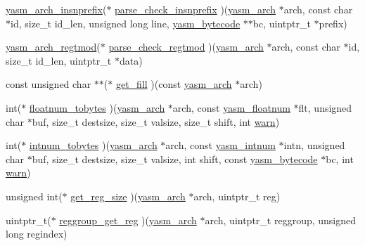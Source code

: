 \begin{DoxyCompactItemize}
\item 
\hyperlink{arch_8h_ac21db64e3ba86dfe84f8028f8c14cb2a}{yasm\-\_\-arch\-\_\-insnprefix}($\ast$ \hyperlink{structyasm__arch__module_a3dde1b6ec44c7d351f795ddafd364c48}{parse\-\_\-check\-\_\-insnprefix} )(\hyperlink{coretype_8h_a8e0de61d73c940f0e7b6ef12e0dc1c70}{yasm\-\_\-arch} $\ast$arch, const char $\ast$id, size\-\_\-t id\-\_\-len, unsigned long line, \hyperlink{structyasm__bytecode}{yasm\-\_\-bytecode} $\ast$$\ast$bc, uintptr\-\_\-t $\ast$prefix)
\item 
\hyperlink{arch_8h_a1261e0e39e12f0e4490924676c591376}{yasm\-\_\-arch\-\_\-regtmod}($\ast$ \hyperlink{structyasm__arch__module_a3ebd6e4bda71c110b9455b3965c148dd}{parse\-\_\-check\-\_\-regtmod} )(\hyperlink{coretype_8h_a8e0de61d73c940f0e7b6ef12e0dc1c70}{yasm\-\_\-arch} $\ast$arch, const char $\ast$id, size\-\_\-t id\-\_\-len, uintptr\-\_\-t $\ast$data)
\item 
const unsigned char $\ast$$\ast$($\ast$ \hyperlink{structyasm__arch__module_abb1c7db4c07489d563408f13526e7ef0}{get\-\_\-fill} )(const \hyperlink{coretype_8h_a8e0de61d73c940f0e7b6ef12e0dc1c70}{yasm\-\_\-arch} $\ast$arch)
\item 
int($\ast$ \hyperlink{structyasm__arch__module_adccc4dbe8cfed3b9a647622b70489468}{floatnum\-\_\-tobytes} )(\hyperlink{coretype_8h_a8e0de61d73c940f0e7b6ef12e0dc1c70}{yasm\-\_\-arch} $\ast$arch, const \hyperlink{structyasm__floatnum}{yasm\-\_\-floatnum} $\ast$flt, unsigned char $\ast$buf, size\-\_\-t destsize, size\-\_\-t valsize, size\-\_\-t shift, int \hyperlink{structwarn}{warn})
\item 
int($\ast$ \hyperlink{structyasm__arch__module_a07202501842115d0216311060c3ede71}{intnum\-\_\-tobytes} )(\hyperlink{coretype_8h_a8e0de61d73c940f0e7b6ef12e0dc1c70}{yasm\-\_\-arch} $\ast$arch, const \hyperlink{structyasm__intnum}{yasm\-\_\-intnum} $\ast$intn, unsigned char $\ast$buf, size\-\_\-t destsize, size\-\_\-t valsize, int shift, const \hyperlink{structyasm__bytecode}{yasm\-\_\-bytecode} $\ast$bc, int \hyperlink{structwarn}{warn})
\item 
unsigned int($\ast$ \hyperlink{structyasm__arch__module_ab2fe2c571343ff116fad50c18f320ebd}{get\-\_\-reg\-\_\-size} )(\hyperlink{coretype_8h_a8e0de61d73c940f0e7b6ef12e0dc1c70}{yasm\-\_\-arch} $\ast$arch, uintptr\-\_\-t reg)
\item 
uintptr\-\_\-t($\ast$ \hyperlink{structyasm__arch__module_a482192e63715c1c9e92fe96ecb42c097}{reggroup\-\_\-get\-\_\-reg} )(\hyperlink{coretype_8h_a8e0de61d73c940f0e7b6ef12e0dc1c70}{yasm\-\_\-arch} $\ast$arch, uintptr\-\_\-t reggroup, unsigned long regindex)

\end{DoxyCompactItemize}
